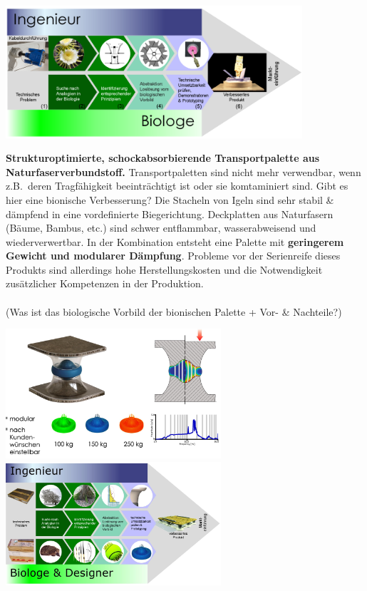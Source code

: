 \begin{center}
    \includegraphics[width=11cm]{lec6/figures/top-down.png}
\end{center}
\textbf{Strukturoptimierte, schockabsorbierende Transportpalette aus Naturfaserverbundstoff.} Transportpaletten sind nicht mehr verwendbar, wenn z.B.\ deren Tragfähigkeit beeinträchtigt ist oder sie komtaminiert sind. Gibt es hier eine bionische Verbesserung? Die Stacheln von Igeln sind sehr stabil \& dämpfend in eine vordefinierte Biegerichtung. Deckplatten aus Naturfasern (Bäume, Bambus, etc.) sind schwer entflammbar, wasserabweisend und wiederverwertbar. In der Kombination entsteht eine Palette mit \textbf{geringerem Gewicht und modularer Dämpfung}. Probleme vor der Serienreife dieses Produkts sind allerdings hohe Herstellungskosten und die Notwendigkeit zusätzlicher Kompetenzen in der Produktion.
\\\\
(\dangersign Was ist das biologische Vorbild der bionischen Palette + Vor- \& Nachteile?)
\begin{center}
    \includegraphics[width=8cm]{lec6/figures/palette.png}
    \hfill
    \includegraphics[width=8cm]{lec6/figures/palette-top-down.png}
\end{center}

